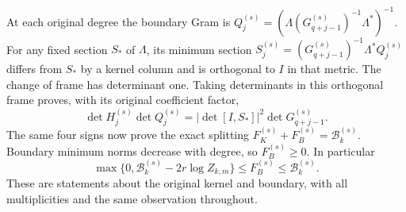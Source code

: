 \documentclass[11pt,a4paper]{article}
\begin{document}
At each original degree the boundary Gram is
$Q_j^{(s)}=(\Lambda(G_{q+j-1}^{(s)})^{-1}\Lambda^*)^{-1}$.
For any fixed section $S_*$ of $\Lambda$, its minimum section
$S_j^{(s)}=(G_{q+j-1}^{(s)})^{-1}\Lambda^*Q_j^{(s)}$ differs from
$S_*$ by a kernel column and is orthogonal to $I$ in that metric.
The change of frame has determinant one. Taking determinants in this
orthogonal frame proves, with its original coefficient factor,
\[
 \det H_j^{(s)}\det Q_j^{(s)}
       =|\det[I,S_*]|^2\det G_{q+j-1}^{(s)}.
\]
The same four signs now prove the exact splitting
$F_K^{(s)}+F_B^{(s)}=\mathcal B_k^{(s)}$. Boundary minimum norms
decrease with degree, so $F_B^{(s)}\ge0$. In particular
\[
 \boxed{\max\{0,\mathcal B_k^{(s)}-2r\log Z_{k,m}\}
       \le F_B^{(s)}\le\mathcal B_k^{(s)}.}\tag{KAF21}
\]
These are statements about the original kernel and boundary, with
all multiplicities and the same observation throughout.
\end{document}
